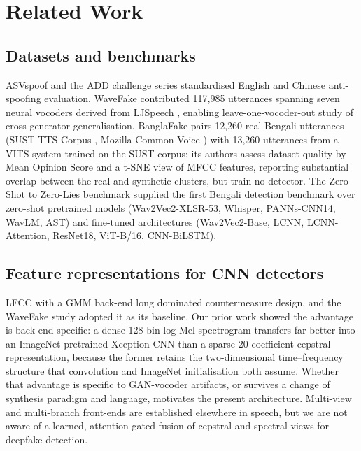 \documentclass[conference]{IEEEtran}
\renewcommand{\cite}[1]{\unskip}
\begin{document}
\section{Related Work}

\subsection{Datasets and benchmarks}
ASVspoof \cite{todisco2019asvspoof} and the ADD challenge series
standardised English and Chinese anti-spoofing evaluation. WaveFake
\cite{frank2021wavefake} contributed 117,985 utterances spanning seven
neural vocoders derived from LJSpeech \cite{ito2017ljspeech}, enabling
leave-one-vocoder-out study of cross-generator generalisation. BanglaFake
\cite{fahad2025banglafake} pairs 12,260 real Bengali utterances (SUST TTS
Corpus \cite{ahmad2021sust}, Mozilla Common Voice \cite{ardila2020commonvoice})
with 13,260 utterances from a VITS \cite{kim2021vits} system trained on the
SUST corpus; its authors assess dataset quality by Mean Opinion Score and a
t-SNE view of MFCC features, reporting substantial overlap between the real
and synthetic clusters, but train no detector. The Zero-Shot to Zero-Lies benchmark
supplied the first Bengali detection benchmark over zero-shot pretrained
models (Wav2Vec2-XLSR-53, Whisper, PANNs-CNN14, WavLM, AST) and fine-tuned
architectures (Wav2Vec2-Base, LCNN, LCNN-Attention, ResNet18, ViT-B/16,
CNN-BiLSTM).

\subsection{Feature representations for CNN detectors}
LFCC with a GMM back-end long dominated countermeasure design, and the
WaveFake study adopted it as its baseline. Our prior work showed the advantage is
back-end-specific: a dense 128-bin log-Mel spectrogram transfers far better
into an ImageNet-pretrained Xception CNN \cite{chollet2017xception} than a
sparse 20-coefficient cepstral representation, because the former retains
the two-dimensional time--frequency structure that convolution and
ImageNet initialisation both assume. Whether that advantage is specific to
GAN-vocoder artifacts, or survives a change of synthesis paradigm and
language, motivates the present architecture. Multi-view and multi-branch
front-ends are established elsewhere in speech, but we are not aware of a
learned, attention-gated fusion of cepstral and spectral views for deepfake
detection.
\end{document}
